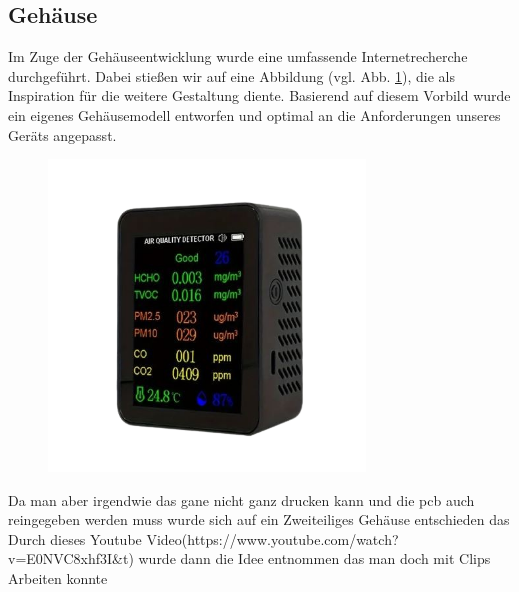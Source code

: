 \begin{inhalt}
\clearpage  %


\newpage

\section{Gehäuse}

Im Zuge der Gehäuseentwicklung wurde eine umfassende Internetrecherche durchgeführt. Dabei stießen wir auf eine Abbildung (vgl. Abb. \ref{fig:gehaeuse_internet_bild}), die als Inspiration für die weitere Gestaltung diente. Basierend auf diesem Vorbild wurde ein eigenes Gehäusemodell entworfen und optimal an die Anforderungen unseres Geräts angepasst.


\begin{figure}[!htb]
\centering
\includegraphics[width=0.75\textwidth]{files/Thomas/pics/new/Temu-removebg-preview.png}
\caption[Bildbezeichnung für Abbildungsverzeichnis]{}
\label{fig:gehaeuse_internet_bild}
\end{figure}

Da man aber irgendwie das gane nicht ganz drucken kann und die pcb auch reingegeben werden muss wurde sich auf ein Zweiteiliges Gehäuse entschieden das Durch dieses Youtube Video(https://www.youtube.com/watch?v=E0NVC8xhf3I&t) wurde dann die Idee entnommen das man doch mit Clips Arbeiten konnte 



\end{inhalt}